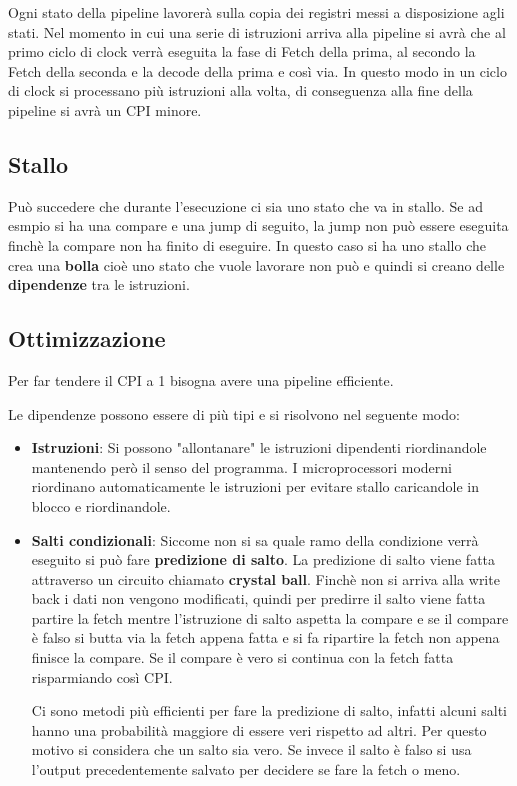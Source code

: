 \documentclass[a4paper]{article}
\theoremstyle{break}
\theoremstyle{break}
\theoremstyle{break}
\theoremstyle{break}
\begin{document}
\noindent Ogni stato della pipeline lavorerà sulla copia dei registri messi a disposizione
agli stati. Nel momento in cui una serie di istruzioni arriva alla pipeline si avrà che
al primo ciclo di clock verrà eseguita la fase di Fetch della prima, al secondo la Fetch
della seconda e la decode della prima e così via. In questo modo in un ciclo di clock
si processano più istruzioni alla volta, di conseguenza alla fine della pipeline
si avrà un CPI minore.

\subsection{Stallo}
Può succedere che durante l'esecuzione ci sia uno stato che va in stallo. Se ad esmpio
si ha una compare e una jump di seguito, la jump non può essere eseguita finchè la
compare non ha finito di eseguire. In questo caso si ha uno stallo che crea una
\textbf{bolla} cioè uno stato che vuole lavorare non può e quindi si creano delle
\textbf{dipendenze} tra le istruzioni.

\subsection{Ottimizzazione}
Per far tendere il CPI a 1 bisogna avere una pipeline efficiente.

\vspace{1em}
\noindent Le dipendenze possono essere di più tipi e si risolvono nel seguente modo:
\begin{itemize}
  \item \textbf{Istruzioni}:
    Si possono "allontanare" le istruzioni dipendenti riordinandole
    mantenendo però il senso del programma. I microprocessori moderni riordinano
    automaticamente le istruzioni per evitare stallo caricandole in blocco e
    riordinandole.
  \item \textbf{Salti condizionali}: Siccome non si sa quale ramo della condizione
    verrà eseguito si può fare \textbf{predizione di salto}. La predizione di salto
    viene fatta attraverso un circuito chiamato \textbf{crystal ball}. Finchè non si
    arriva alla write back i dati non vengono modificati, quindi per predirre il salto
    viene fatta partire la fetch mentre l'istruzione di salto aspetta la compare e
    se il compare è falso si butta via la fetch appena fatta e si fa ripartire la
    fetch non appena finisce la compare. Se il compare è vero si continua con la fetch
    fatta risparmiando così CPI.

    \vspace{1em}
    \noindent Ci sono metodi più efficienti per fare la predizione di salto, infatti alcuni
    salti hanno una probabilità maggiore di essere veri rispetto ad altri. Per questo
    motivo si considera che un salto sia vero. Se invece il salto è falso si usa
    l'output precedentemente salvato per decidere se fare la fetch o meno.
\end{itemize}
\end{document}
